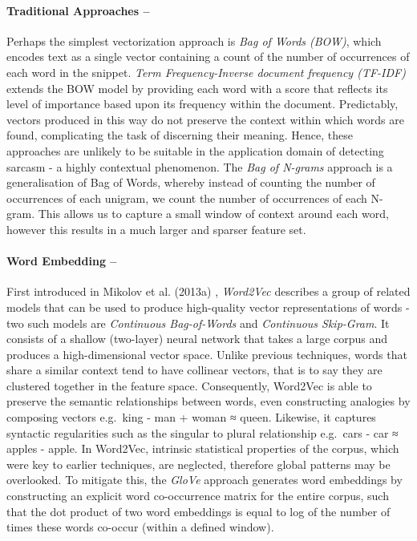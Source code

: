 \documentclass[12pt,a4paper]{article}
\begin{document}
\paragraph{Traditional Approaches --}
\noindent Perhaps the simplest vectorization approach is \textit{Bag of Words (BOW)}, which encodes text as a single vector containing a count of the number of occurrences of each word in the snippet. \textit{Term Frequency-Inverse document frequency (TF-IDF)} \cite{robertson1976relevance} extends the BOW model by providing each word with a score that reflects its level of importance based upon its frequency within the document. Predictably, vectors produced in this way do not preserve the context within which words are found, complicating the task of discerning their meaning. Hence, these approaches are unlikely to be suitable in the application domain of detecting sarcasm - a highly contextual phenomenon. The \textit{Bag of N-grams} approach is a generalisation of Bag of Words, whereby instead of counting the number of occurrences of each unigram, we count the number of occurrences of each N-gram. This allows us to capture a small window of context around each word, however this results in a much larger and sparser feature set.
\vfill
\paragraph{Word Embedding --}
\noindent First introduced in Mikolov et al. (2013a) \cite{mikolov2013efficient}, \textit{Word2Vec} describes a group of related models that can be used to produce high-quality vector representations of words - two such models are \textit{Continuous Bag-of-Words} and \textit{Continuous Skip-Gram}. It consists of a shallow (two-layer) neural network that takes a large corpus and produces a high-dimensional vector space. Unlike previous techniques, words that share a similar context tend to have collinear vectors, that is to say they are clustered together in the feature space. Consequently, Word2Vec is able to preserve the semantic relationships between words, even constructing analogies by composing vectors e.g.\ king - man + woman ≈ queen. Likewise, it captures syntactic regularities such as the singular to plural relationship e.g.\ cars - car ≈ apples - apple. In Word2Vec, intrinsic statistical properties of the corpus, which were key to earlier techniques, are neglected, therefore global patterns may be overlooked. To mitigate this, the \textit{GloVe} \cite{pennington2014glove} approach generates word embeddings by constructing an explicit word co-occurrence matrix for the entire corpus, such that the dot product of two word embeddings is equal to log of the number of times these words co-occur (within a defined window).
\end{document}
